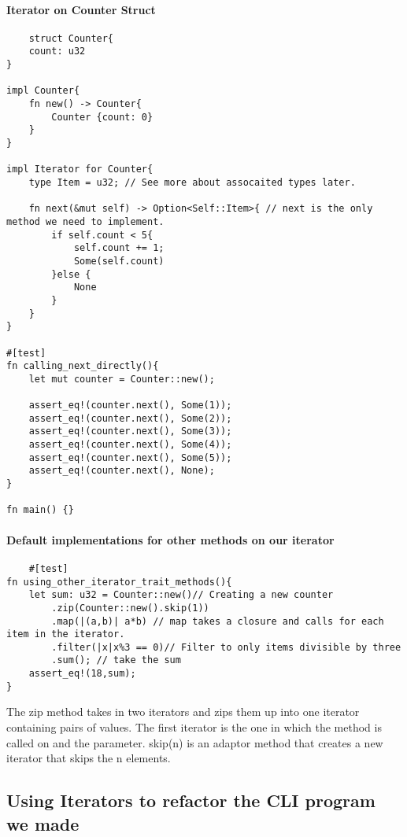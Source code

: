 \paragraph*{Iterator on Counter Struct}\begin{lstlisting}
    struct Counter{
    count: u32
}

impl Counter{
    fn new() -> Counter{
        Counter {count: 0}
    }
}

impl Iterator for Counter{
    type Item = u32; // See more about assocaited types later.

    fn next(&mut self) -> Option<Self::Item>{ // next is the only method we need to implement.
        if self.count < 5{
            self.count += 1;
            Some(self.count)
        }else {
            None
        }
    }
}

#[test]
fn calling_next_directly(){
    let mut counter = Counter::new();

    assert_eq!(counter.next(), Some(1));
    assert_eq!(counter.next(), Some(2));
    assert_eq!(counter.next(), Some(3));
    assert_eq!(counter.next(), Some(4));
    assert_eq!(counter.next(), Some(5));
    assert_eq!(counter.next(), None);
}

fn main() {}
\end{lstlisting}

\paragraph*{Default implementations for other methods on our iterator}\begin{lstlisting}
    #[test]
fn using_other_iterator_trait_methods(){
    let sum: u32 = Counter::new()// Creating a new counter
        .zip(Counter::new().skip(1))
        .map(|(a,b)| a*b) // map takes a closure and calls for each item in the iterator.
        .filter(|x|x%3 == 0)// Filter to only items divisible by three
        .sum(); // take the sum
    assert_eq!(18,sum);
}
\end{lstlisting}
The zip method takes in two iterators and zips them up into one iterator containing pairs of values. 
The first iterator is the one in which the method is called on and the parameter. 
skip(n) is an adaptor method that creates a new iterator that skips the n elements.
        
\subsection{Using Iterators to refactor the CLI program we made}

